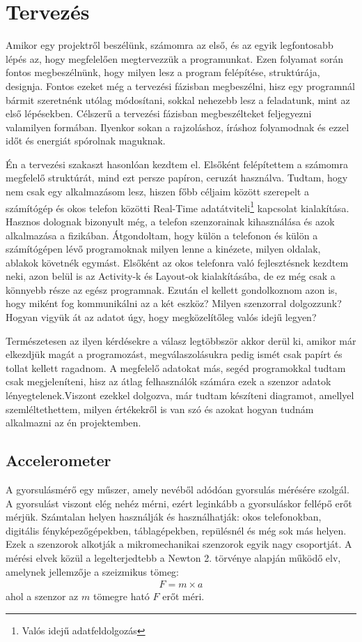 \documentclass{thesis-ekf}
\theoremstyle{definition}
\theoremstyle{remark}
\begin{document}
\chapter{Tervezés}
	Amikor egy projektről beszélünk, számomra az első, és az egyik legfontosabb lépés az, hogy megfelelően megtervezzük a programunkat. Ezen folyamat során fontos megbeszélnünk, hogy milyen lesz a program felépítése, struktúrája, designja. Fontos ezeket még a tervezési fázisban megbeszélni, hisz egy programnál bármit szeretnénk utólag módosítani, sokkal nehezebb lesz a feladatunk, mint az első lépésekben. Célszerű a tervezési fázisban megbeszélteket feljegyezni valamilyen formában. Ilyenkor sokan a rajzoláshoz, íráshoz folyamodnak és ezzel időt és energiát spórolnak maguknak.
	\par Én a tervezési szakaszt hasonlóan kezdtem el. Elsőként felépítettem a számomra megfelelő struktúrát, mind ezt persze papíron, ceruzát használva. Tudtam, hogy nem csak egy alkalmazásom lesz, hiszen főbb céljaim között szerepelt a számítógép és okos telefon közötti Real-Time adatátviteli\footnote{Valós idejű adatfeldolgozás} kapcsolat kialakítása. Hasznos dolognak bizonyult még, a telefon szenzorainak kihasználása és azok alkalmazása a fizikában. Átgondoltam, hogy külön a telefonon és külön a számítógépen lévő programoknak milyen lenne a kinézete, milyen oldalak, ablakok követnék egymást. Elsőként az okos telefonra való fejlesztésnek kezdtem neki, azon belül is az Activity-k és Layout-ok kialakításába, de ez még csak a könnyebb része az egész programnak. Ezután el kellett gondolkoznom azon is, hogy miként fog kommunikálni az a két eszköz? Milyen szenzorral dolgozzunk? Hogyan vigyük át az adatot úgy, hogy megközelítőleg valós idejű legyen?
	\par Természetesen az ilyen kérdésekre a válasz legtöbbször akkor derül ki, amikor már elkezdjük magát a programozást, megválaszolásukra pedig ismét csak papírt és tollat kellett ragadnom. A megfelelő adatokat más, segéd programokkal tudtam csak megjeleníteni, hisz az átlag felhasználók számára ezek a szenzor adatok lényegtelenek.Viszont ezekkel dolgozva, már tudtam készíteni diagramot, amellyel szemléltethettem, milyen értékekről is van szó és azokat hogyan tudnám alkalmazni az én projektemben.
\section{Accelerometer}
A gyorsulásmérő egy műszer, amely nevéből adódóan gyorsulás mérésére szolgál. A gyorsulást viszont elég nehéz mérni, ezért leginkább a gyorsuláskor fellépő erőt mérjük. Számtalan helyen használják és használhatják: okos telefonokban, digitális fényképezőgépekben, táblagépekben, repülésnél és még sok más helyen. Ezek a szenzorok alkotják a mikromechanikai szenzorok egyik nagy csoportját. A mérési elvek közül a legelterjedtebb a Newton 2. törvénye alapján működő elv, amelynek jellemzője a szeizmikus tömeg:
\begin{align*}
F=m\times a
\end{align*}
ahol a szenzor az $m$ tömegre ható $F$ erőt méri.
\end{document}
